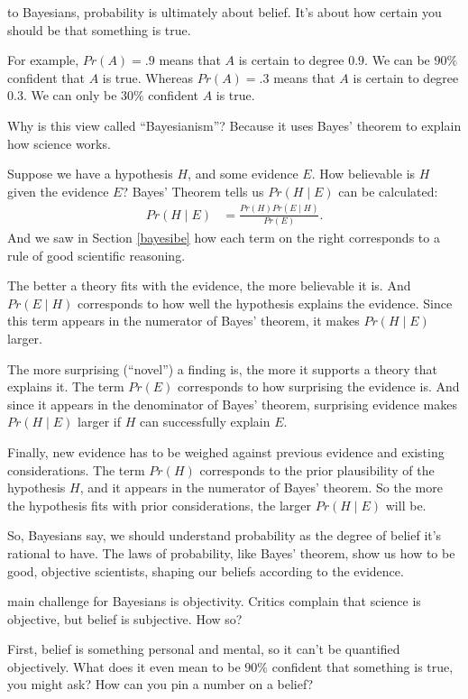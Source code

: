 \documentclass[justified]{tufte-book}
\newcommand{\given}{\mid}
\newcommand{\p}{Pr}
\theoremstyle{definition}
\theoremstyle{definition}
\theoremstyle{definition}
\theoremstyle{remark}
\begin{document}
 to Bayesians, probability is ultimately about
belief. It's about how certain you should be that something is true.

For example, \(\p(A)=.9\) means that \(A\) is certain to degree \(0.9\).
We can be \(90\%\) confident that \(A\) is true. Whereas \(\p(A)=.3\)
means that \(A\) is certain to degree \(0.3\). We can only be \(30\%\)
confident \(A\) is true.

Why is this view called ``Bayesianism''? Because it uses Bayes' theorem
to explain how science works.

Suppose we have a hypothesis \(H\), and some evidence \(E\). How
believable is \(H\) given the evidence \(E\)? Bayes' Theorem tells us
\(\p(H \given E)\) can be calculated: \[
  \begin{aligned}
    \p(H \given E) &= \frac{\p(H)\p(E \given H)}{\p(E)}.
  \end{aligned}
\] And we saw in Section \ref{bayesibe} how each term on the right
corresponds to a rule of good scientific reasoning.

The better a theory fits with the evidence, the more believable it is.
And \(\p(E \given H)\) corresponds to how well the hypothesis explains
the evidence. Since this term appears in the numerator of Bayes'
theorem, it makes \(\p(H \given E)\) larger.

The more surprising (``novel'') a finding is, the more it supports a
theory that explains it. The term \(\p(E)\) corresponds to how
surprising the evidence is. And since it appears in the denominator of
Bayes' theorem, surprising evidence makes \(\p(H \given E)\) larger if
\(H\) can successfully explain \(E\).

Finally, new evidence has to be weighed against previous evidence and
existing considerations. The term \(\p(H)\) corresponds to the prior
plausibility of the hypothesis \(H\), and it appears in the numerator of
Bayes' theorem. So the more the hypothesis fits with prior
considerations, the larger \(\p(H \given E)\) will be.

So, Bayesians say, we should understand probability as the degree of
belief it's rational to have. The laws of probability, like Bayes'
theorem, show us how to be good, objective scientists, shaping our
beliefs according to the evidence.

 main challenge for Bayesians is objectivity. Critics
complain that science is objective, but belief is subjective. How so?

First, belief is something personal and mental, so it can't be
quantified objectively. What does it even mean to be \(90\%\) confident
that something is true, you might ask? How can you pin a number on a
belief?
\end{document}
